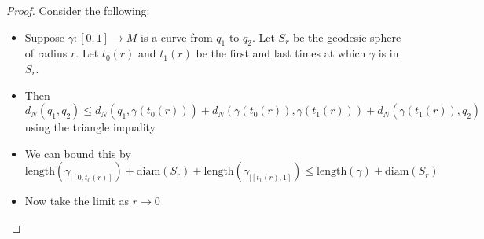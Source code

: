 \documentclass[a4paper,11pt]{article}
\begin{document}
\begin{proof}
  Consider the following:
  \begin{itemize}
    \item Suppose $\gamma:[0,1] \to M$ is a curve from $q_1$ to $q_2$.
          Let $S_r$ be the geodesic sphere of radius $r$. 
          Let $t_0(r)$ and $t_1(r)$ be the first and last times at which $\gamma$ is in $S_r$.
    \item Then \[d_N(q_1,q_2) \leq d_N(q_1,\gamma(t_0(r))) + d_N(\gamma(t_0(r)),\gamma(t_1(r))) + d_N(\gamma(t_1(r)),q_2) \] using the triangle inquality
    \item We can bound this by \[\text{length}(\gamma_{|[0,t_0(r)]}) + \text{diam}(S_r) + \text{length}(\gamma_{|[t_1(r),1]}) \leq \text{length}(\gamma)+ \text{diam}(S_r)\]
    \item Now take the limit as $r \to 0$
  \end{itemize}
\end{proof}
\end{document}
